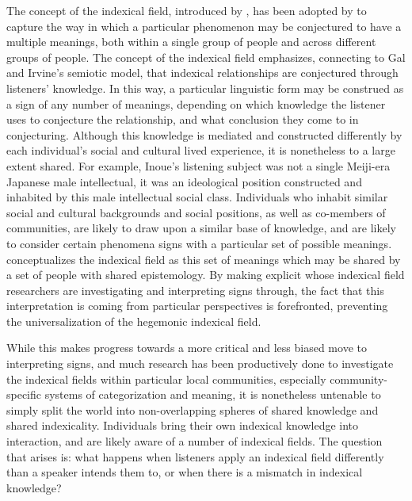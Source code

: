 \documentclass[12pt,twoside]{reedthesis}
\begin{document}
The concept of the indexical field, introduced by \textcite{eckert_variation_2008}, has been adopted by \textcite{calder_whose_2021} to capture the way in which a particular phenomenon may be conjectured to have a multiple meanings, both within a single group of people and across different groups of people. The concept of the indexical field emphasizes, connecting to Gal and Irvine's \parencite*{gal_signs_2019} semiotic model, that indexical relationships are conjectured through listeners' knowledge. In this way, a particular linguistic form may be construed as a sign of any number of meanings, depending on which knowledge the listener uses to conjecture the relationship, and what conclusion they come to in conjecturing. Although this knowledge is mediated and constructed differently by each individual's social and cultural lived experience, it is nonetheless to a large extent shared. For example, Inoue's \parencite*{inoue_listening_2003} listening subject was not a single Meiji-era Japanese male intellectual, it was an ideological position constructed and inhabited by this male intellectual social class. Individuals who inhabit similar social and cultural backgrounds and social positions, as well as co-members of communities, are likely to draw upon a similar base of knowledge, and are likely to consider certain phenomena signs with a particular set of possible meanings.  \textcite{calder_whose_2021} conceptualizes the indexical field as this set of meanings which may be shared by a set of people with shared epistemology. By making explicit whose indexical field researchers are investigating and interpreting signs through, the fact that this interpretation is coming from particular perspectives is forefronted, preventing the universalization of the hegemonic indexical field.
	 
While this makes progress towards a more critical and less biased move to interpreting signs, and much research has been productively done to investigate the indexical fields within particular local communities, especially community-specific systems of categorization and meaning, it is nonetheless untenable to simply split the world into non-overlapping spheres of shared knowledge and shared indexicality. Individuals bring their own indexical knowledge into interaction, and are likely aware of a number of indexical fields. The question that arises is: what happens when listeners apply an indexical field differently than a speaker intends them to, or when there is a mismatch in indexical knowledge?
	 
\end{document}
